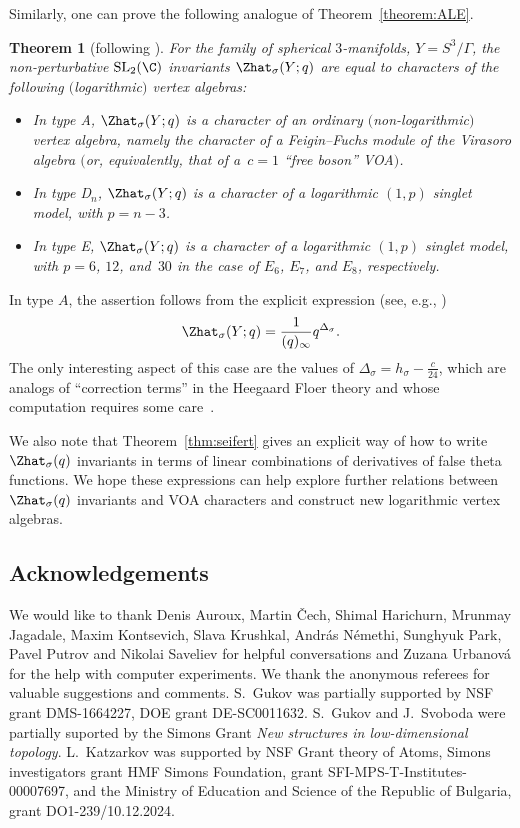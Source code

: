 \documentclass[10pt,a4paper]{amsart}
\newtheorem{Theorem}{Theorem}[section]
\begin{document}
Similarly, one can prove the following analogue of Theorem~\ref{theorem:ALE}.
%
\begin{Theorem}[following \cite{CCFFGHP22}]
	For the family of spherical $3$-manifolds, $Y = S^3 / \Gamma$, the non-perturbative $\operatorname{SL}_2(\C)$ invariants $\Zhat_{\sigma} (Y; q)$ are equal to characters of the following $($logarithmic$)$ vertex algebras:
	\begin{itemize}\itemsep=0pt
\item In type A, $\Zhat_{\sigma} (Y; q)$ is a character of an ordinary $($non-logarithmic$)$ vertex algebra, namely the character of a Feigin--Fuchs module of the Virasoro algebra $($or, equivalently, that of a~${c = 1}$ ``free boson'' VOA$)$.

		\item In type D$_n$, $\Zhat_{\sigma} (Y; q)$ is a character of a logarithmic $(1, p)$ singlet model, with $p = n-3$.

		\item In type E, $\Zhat_{\sigma} (Y; q)$ is a character of a logarithmic $(1, p)$ singlet model, with $p = 6$, $12$, and~$30$ in the case of $E_6$, $E_7$, and $E_8$, respectively.

	\end{itemize}
\end{Theorem}

\begin{Remark}
	In type $A$, the assertion follows from the explicit expression (see, e.g., \cite{GPV16})
	\[
		\Zhat_{\sigma} (Y; q) = \frac{1}{(q)_{\infty}} q^{\Delta_\sigma}.
	\]
	The only interesting aspect of this case are the values of $\Delta_\sigma = h_\sigma - \frac{c}{24}$, which are analogs of ``correction terms'' in the Heegaard Floer theory and whose computation requires some care~\mbox{\cite{AJK21, GPP20}}.
\end{Remark}
We also note that Theorem~\ref{thm:seifert} gives an explicit way of how to write $\Zhat_{\sigma} (q)$ invariants in terms of linear combinations of derivatives of false theta functions. We hope these expressions can help explore further relations between $\Zhat_{\sigma} (q)$ invariants and VOA characters and construct new logarithmic vertex algebras.


\subsection*{Acknowledgements}

We would like to thank Denis Auroux, Martin \v{C}ech, Shimal Harichurn, Mrunmay Jagadale, Maxim Kontsevich, Slava Krushkal, Andr\'as N\'emethi, Sunghyuk Park, Pavel Putrov and Nikolai Saveliev for helpful conversations and Zuzana Urbanov\'a for the help with computer experiments. We thank the anonymous referees for valuable suggestions and comments.
S.~Gukov was partially
supported by NSF grant DMS-1664227, DOE grant DE-SC0011632. S.~Gukov and J.~Svoboda were partially suported by the Simons Grant {\it New structures in low-dimensional topology}.
L.~Katzarkov was supported by NSF Grant theory of Atoms, Simons investigators grant
HMF Simons Foundation, grant SFI-MPS-T-Institutes-00007697, and the Ministry of Education and Science of the Republic of Bulgaria, grant DO1-239/10.12.2024.
\end{document}
